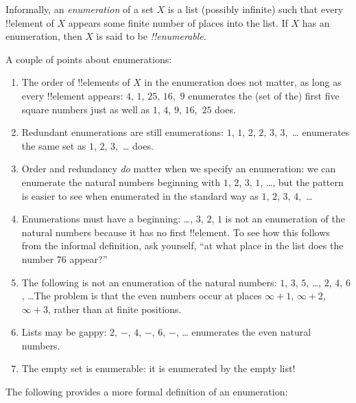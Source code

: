 \documentclass[../../include/open-logic-section]{subfiles}
\begin{document}


\begin{defn}
Informally, an \emph{enumeration} of a set $X$ is a list (possibly
infinite) such that every !!{element} of $X$ appears some finite number of
places into the list. If $X$ has an enumeration, then $X$ is said to
be \emph{!!{enumerable}}.
\end{defn}

\begin{explain}
A couple of points about enumerations:

\begin{enumerate}
\item The order of !!{element}s of $X$ in the enumeration does not
  matter, as long as every !!{element} appears: $4$, $1$, $2$5,
  $16$,~$9$ enumerates the (set of the) first five square numbers just
  as well as $1$, $4$, $9$, $16$,~$25$ does.
\item Redundant enumerations are still enumerations: $1$, $1$, $2$,
  $2$, $3$, $3$,~\dots{} enumerates the same set as $1$, $2$,
  $3$,~\dots{} does.
\item Order and redundancy \emph{do} matter when we specify an
  enumeration: we can enumerate the natural numbers beginning with
  $1$, $2$, $3$, $1$, \dots{}, but the pattern is easier to see when
  enumerated in the standard way as $1$, $2$, $3$, $4$,~\dots
\item Enumerations must have a beginning: \dots, $3$, $2$, $1$ is not
  an enumeration of the natural numbers because it has no first
  !!{element}. To see how this follows from the informal definition,
  ask yourself, ``at what place in the list does the number 76
  appear?''
\item The following is not an enumeration of the natural numbers: $1$,
  $3$, $5$, \dots, $2$, $4$, $6$, \dots\@ The problem is that the even
  numbers occur at places $\infty + 1$, $\infty + 2$, $\infty + 3$,
  rather than at finite positions.
\item Lists may be gappy: $2$, $-$, $4$, $-$, $6$, $-$, \dots{}
  enumerates the even natural numbers.
\item The empty set is enumerable: it is enumerated by the empty list!
\end{enumerate}
\end{explain}

The following provides a more formal definition of an 
enumeration:
\end{document}
